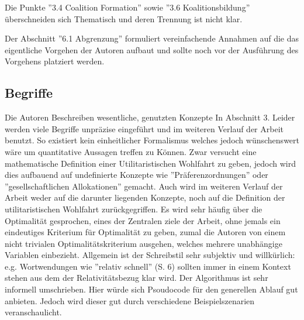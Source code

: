 \documentclass[sigconf]{acmart}
\theoremstyle{break}
\begin{document}
Die Punkte ''3.4 Coalition Formation'' sowie ''3.6 Koalitionsbildung'' überschneiden sich Thematisch und deren Trennung ist nicht klar.

Der Abschnitt ''6.1 Abgrenzung'' formuliert vereinfachende Annahmen auf die das eigentliche Vorgehen der Autoren aufbaut und sollte noch vor der Ausführung des Vorgehens platziert werden.


\subsection*{Begriffe}
Die Autoren Beschreiben wesentliche, genutzten Konzepte In Abschnitt 3. Leider werden viele Begriffe unpräzise eingeführt und im weiteren Verlauf der Arbeit benutzt.
So existiert kein einheitlicher Formalismus welches jedoch wünschenswert wäre um quantitative Aussagen treffen zu Können.
Zwar versucht eine mathematische Definition einer Utilitaristischen Wohlfahrt zu geben, jedoch wird dies aufbauend auf undefinierte Konzepte wie ''Präferenzordnungen'' oder ''gesellschaftlichen Allokationen'' gemacht.
Auch wird im weiteren Verlauf der Arbeit weder auf die darunter liegenden Konzepte, noch auf die Definition der utilitaristischen Wohlfahrt zurückgegriffen.
Es wird sehr häufig über die Optimalität gesprochen, eines der Zentralen ziele der Arbeit, ohne jemals ein eindeutiges Kriterium für Optimalität zu geben,
zumal die Autoren von einem nicht trivialen Optimalitätskriterium ausgehen, welches mehrere unabhängige Variablen einbezieht.
Allgemein ist der Schreibstil sehr subjektiv und willkürlich: e.g. Wortwendungen wie ''relativ schnell'' (S. 6) sollten immer in einem Kontext stehen aus dem der Relativitätsbezug klar wird.
Der Algorithmus ist sehr informell umschrieben. Hier würde sich Psoudocode für den generellen Ablauf gut anbieten. Jedoch wird dieser gut durch verschiedene Beispielszenarien veranschaulicht.
\end{document}
